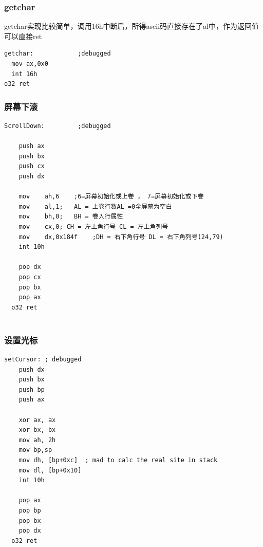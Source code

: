 \documentclass[a4paper,11pt,UTF8]{ctexart}
\begin{document}
        \subsubsection{getchar}
        getchar实现比较简单，调用16h中断后，所得ascii码直接存在了al中，作为返回值可以直接ret
        \begin{lstlisting}[caption={几行getchar },tabsize=4,basicstyle=\footnotesize,captionpos=b]
getchar:			;debugged
  mov ax,0x0
  int 16h
o32 ret
        \end{lstlisting}
        
        \subsubsection{屏幕下滚}
  \begin{lstlisting}[caption={10h6h功能，懒人上卷 },tabsize=4,basicstyle=\footnotesize,captionpos=b]
ScrollDown:			;debugged

    push ax
    push bx
    push cx
    push dx
  
    mov    ah,6    ;6=屏幕初始化或上卷 ， 7=屏幕初始化或下卷
    mov    al,1;   AL = 上卷行数AL =0全屏幕为空白 
    mov    bh,0;   BH = 卷入行属性
    mov    cx,0; CH = 左上角行号 CL = 左上角列号 
    mov    dx,0x184f    ;DH = 右下角行号 DL = 右下角列号(24,79)
    int 10h
  
    pop dx
    pop cx
    pop bx
    pop ax
  o32 ret
      
  \end{lstlisting}
  
        \subsubsection{设置光标}
  \begin{lstlisting}[caption={根据用栈传进来的参数设置光标 },tabsize=4,basicstyle=\footnotesize,captionpos=b]
  setCursor: ; debugged
    push dx
    push bx
    push bp
    push ax
  
    xor ax, ax
    xor bx, bx
    mov ah, 2h
    mov bp,sp
    mov dh, [bp+0xc]  ; mad to calc the real site in stack
    mov dl, [bp+0x10]
    int 10h
  
    pop ax
    pop bp
    pop bx
    pop dx
  o32 ret
  \end{lstlisting}
  
\end{document}
